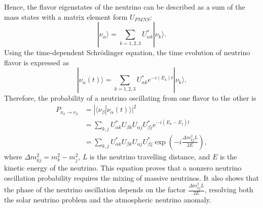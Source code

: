     Hence, the flavor eigenstates of the neutrino can be described as a sum of the mass states with a matrix element form $U_{PMNS}$:
    \begin{equation}\label{eq17}
    |\nu_\alpha\rangle = \sum\limits_{k=1,2,3} U^*_{\alpha k}|\nu_k\rangle.
    \end{equation}
    Using the time-dependent Schr{\"o}dinger equation, the time evolution of neutrino flavor is expressed as
    \begin{equation}
    \label{eq18}
    |\nu_\alpha(t)\rangle = \sum\limits_{k=1,2,3} U^*_{\alpha k}e^{-i(E_k)t}|\nu_k\rangle.
    \end{equation}
    Therefore, the probability of a neutrino oscillating from one flavor to the other is
    \begin{equation}\label{eq19}
    \begin{aligned}
    P_{\nu_\alpha\rightarrow\nu_\beta} & =|\langle\nu_\beta|\nu_\alpha(t)\rangle|^2 \\
    & =\sum\limits_{k,j}U^*_{\alpha k} U_{\beta k} U_{\alpha j} U^*_{\beta j} e^{-i(E_k-E_j)t} \\
    & =\sum\limits_{k,j}U^*_{\alpha k} U_{\beta k} U_{\alpha j} U^*_{\beta j}\exp\left(-i\frac{\Delta m^2_{kj}L}{2E}\right),
    \end{aligned}
    \end{equation}
    where $\Delta m_{kj}^2 =m_k^2 - m_j^2$, $L$ is the neutrino travelling distance, and $E$ is the kinetic energy of the neutrino.
    This equation proves that a nonzero neutrino oscillation probability requires the mixing of massive neutrinos.
    It also shows that the phase of the neutrino oscillation depends on the factor $\frac{\Delta m^2_{kj}L}{2E}$, resolving both the solar neutrino problem and the atmospheric neutrino anomaly. 
    
